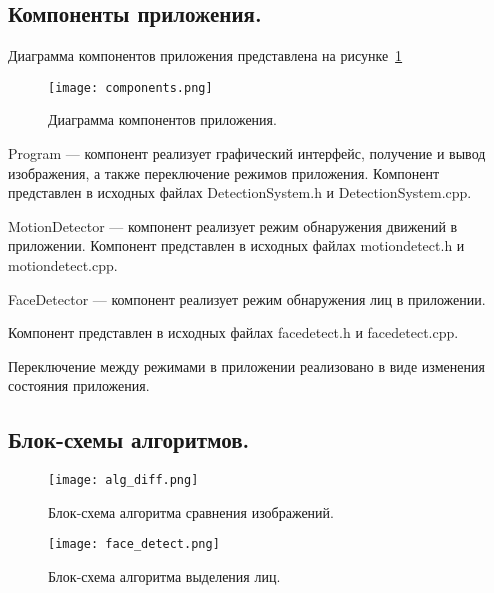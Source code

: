 \subsection{Компоненты приложения. }
\label{sec:program_design:components}
Диаграмма компонентов приложения представлена на рисунке~\ref{fig:components}
\begin{figure}[ht]
\centering
    \centering
    \texttt{[image: components.png]}  
  \caption{Диаграмма компонентов приложения.}
  \label{fig:components}
\end{figure}

Program --- компонент реализует графический интерфейс, получение и вывод изображения, а также переключение режимов приложения. 
Компонент представлен в исходных файлах DetectionSystem.h и DetectionSystem.cpp.

MotionDetector --- компонент реализует режим обнаружения движений в приложении.
Компонент представлен в исходных файлах motiondetect.h и motiondetect.cpp.

FaceDetector --- компонент реализует режим обнаружения лиц в приложении. 

Компонент представлен в исходных файлах facedetect.h и facedetect.cpp.

Переключение между режимами в приложении реализовано в виде изменения состояния приложения.

\subsection{Блок-схемы алгоритмов. }
\label{sec:program_design:flowcharts}

\begin{figure}[ht]
\centering
    \centering
    \texttt{[image: alg\_diff.png]}  
  \caption{Блок-схема алгоритма сравнения изображений.}
  \label{fig:alg_diff}
\end{figure}

\begin{figure}[ht]
\centering
    \centering
    \texttt{[image: face\_detect.png]}  
  \caption{Блок-схема алгоритма выделения лиц.}
  \label{fig:alg_face}
\end{figure}
